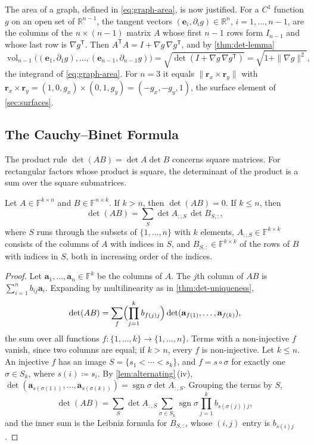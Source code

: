 The area of a graph, defined in \eqref{eq:graph-area}, is now justified. For a $C^1$ function $g$ on an open set of $\mathbb R^{n-1}$, the tangent vectors $(\mathbf e_i,\partial_ig)\in\mathbb R^n$, $i=1,\ldots,n-1$, are the columns of the $n\times(n-1)$ matrix $A$ whose first $n-1$ rows form $I_{n-1}$ and whose last row is $\nabla g^{\mathsf T}$. Then $A^{\mathsf T}A=I+\nabla g\,\nabla g^{\mathsf T}$, and by \cref{thm:det-lemma}
\[
\operatorname{vol}_{n-1}\bigl((\mathbf e_1,\partial_1g),\ldots,(\mathbf e_{n-1},\partial_{n-1}g)\bigr)=\sqrt{\det(I+\nabla g\,\nabla g^{\mathsf T})}=\sqrt{1+\|\nabla g\|^2},
\]
the integrand of \eqref{eq:graph-area}. For $n=3$ it equals $\|\mathbf r_x\times\mathbf r_y\|$ with $\mathbf r_x\times\mathbf r_y=(1,0,g_x)\times(0,1,g_y)=(-g_x,-g_y,1)$, the surface element of \cref{sec:surfaces}.

\subsection{The Cauchy--Binet Formula}

The product rule $\det(AB)=\det A\det B$ concerns square matrices. For rectangular factors whose product is square, the determinant of the product is a sum over the square submatrices.

\begin{theorem}
\label{thm:cauchy-binet}
Let $A\in\mathbb F^{k\times n}$ and $B\in\mathbb F^{n\times k}$. If $k>n$, then $\det(AB)=0$. If $k\le n$, then
\[
\det(AB)=\sum_{S}\det A_{:,S}\,\det B_{S,:},
\]
where $S$ runs through the subsets of $\{1,\ldots,n\}$ with $k$ elements, $A_{:,S}\in\mathbb F^{k\times k}$ consists of the columns of $A$ with indices in $S$, and $B_{S,:}\in\mathbb F^{k\times k}$ of the rows of $B$ with indices in $S$, both in increasing order of the indices.
\end{theorem}

\begin{proof}
Let $\mathbf a_1,\ldots,\mathbf a_n\in\mathbb F^k$ be the columns of $A$. The $j$th column of $AB$ is $\sum_{i=1}^nb_{ij}\mathbf a_i$. Expanding by multilinearity as in \cref{thm:det-uniqueness},
\[
\det(AB)=\sum_f\Bigl(\prod_{j=1}^kb_{f(j)j}\Bigr)\det(\mathbf a_{f(1)},\ldots,\mathbf a_{f(k)}),
\]
the sum over all functions $f\colon\{1,\ldots,k\}\to\{1,\ldots,n\}$. Terms with a non-injective $f$ vanish, since two columns are equal; if $k>n$, every $f$ is non-injective. Let $k\le n$. An injective $f$ has an image $S=\{s_1<\cdots<s_k\}$, and $f=s\circ\sigma$ for exactly one $\sigma\in S_k$, where $s(i)\coloneqq s_i$. By \cref{lem:alternating}\,(iv), $\det(\mathbf a_{s(\sigma(1))},\ldots,\mathbf a_{s(\sigma(k))})=\operatorname{sgn}\sigma\det A_{:,S}$. Grouping the terms by $S$,
\[
\det(AB)=\sum_S\det A_{:,S}\sum_{\sigma\in S_k}\operatorname{sgn}\sigma\prod_{j=1}^kb_{s(\sigma(j))j},
\]
and the inner sum is the Leibniz formula for $B_{S,:}$, whose $(i,j)$ entry is $b_{s(i)j}$.
\end{proof}


